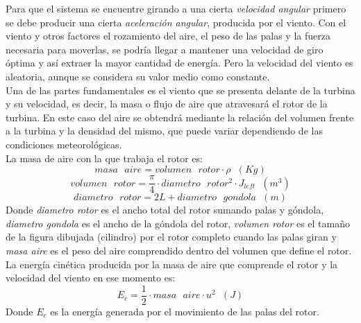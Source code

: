 Para que el sistema se encuentre girando a una cierta \textit{velocidad angular} primero se debe producir una cierta \textit{aceleración angular}, producida por el viento. Con el viento y otros factores el rozamiento del aire, el peso de las palas y la fuerza necesaria para moverlas, se podría llegar a mantener una velocidad de giro óptima y así extraer la mayor cantidad de energía. Pero la velocidad del viento es aleatoria, aunque se considera su valor medio como constante.\\


Una de las partes fundamentales es el viento que se presenta delante de la turbina y su velocidad, es decir, la masa o flujo de aire que atravesará el rotor de la turbina. En este caso del aire se obtendrá mediante la relación del volumen frente a la turbina y la densidad del mismo, que puede variar dependiendo de las condiciones meteorológicas.\\

La masa de aire con la que trabaja el rotor es:
\begin{equation}
    masa \text{ } aire = volumen \text{ } rotor \cdot \rho \hspace{7pt} (Kg)
\label{def:masa_aire}
\end{equation}
\begin{equation}
    volumen \text{ } rotor = \dfrac{\pi}{4} \cdot diametro \text{ } rotor^2 \cdot J_{left} \hspace{7pt} (m^3) 
\end{equation}
\begin{equation}
     diametro \text{ } rotor = 2L + diametro \text{ } gondola \hspace{7pt} (m)
\end{equation}
Donde \textit{diametro rotor} es el ancho total del rotor sumando palas y góndola, \textit{diametro gondola} es el ancho de la góndola del rotor, \textit{volumen rotor} es el tamaño de la figura dibujada (cilindro) por el rotor completo cuando las palas giran y \textit{masa aire} es el peso del aire comprendido dentro del volumen que define el rotor.\\

La energía cinética producida por la masa de aire que comprende el rotor y la velocidad del viento en ese momento es:
\begin{equation}
    E_c = \dfrac{1}{2} \cdot masa \text{ } aire \cdot u^2 \hspace{7pt} (J)
\end{equation}
Donde $E_c$ es la energía generada por el movimiento de las palas del rotor.\\



